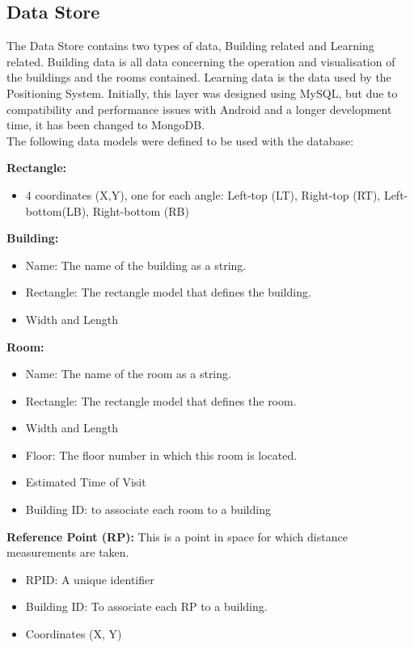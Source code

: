 \subsection{Data Store}
The Data Store contains two types of data, Building related and Learning related. 
Building data is all data concerning the operation and visualisation of the buildings and the rooms contained. Learning data is the data used by the Positioning System.
Initially, this layer was designed using MySQL, but due to compatibility and performance issues with Android and a longer development time, it has been changed to MongoDB.
\\
The following data models were defined to be used with the database:

\textbf{Rectangle:}	
\begin{itemize}
	\item 4 coordinates (X,Y), one for each angle: Left-top (LT), Right-top (RT), Left-bottom(LB), Right-bottom (RB)
\end{itemize}

\textbf{Building:}
\begin{itemize}
	\item Name: The name of the building as a string.
	\item Rectangle: The rectangle model that defines the building.
	\item Width and Length
\end{itemize}


\textbf{Room:} 
\begin{itemize}
	\item Name: The name of the room as a string.
	\item Rectangle: The rectangle model that defines the room.
	\item Width and Length
	\item Floor: The floor number in which this room is located.
	\item Estimated Time of Visit
	\item Building ID: to associate each room to a building
\end{itemize}

\textbf{Reference Point (RP):} This is a point in space for which distance measurements are taken.
\begin{itemize}
	\item RPID: A unique identifier
	\item Building ID: To associate each RP to a building.
	\item Coordinates (X, Y)
\end{itemize}

